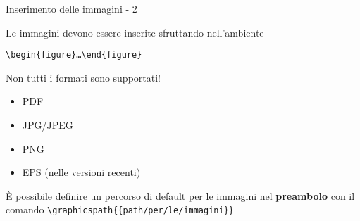 \begin{frame}{Inserimento delle immagini - 2}
	
Le immagini devono essere inserite sfruttando nell'ambiente 
\centerline{
\texttt{\textbackslash{}begin\{figure\}\dots{}\textbackslash{}end\{figure\}}
}

\vfill

Non tutti i formati sono supportati!
\begin{itemize}
	\item PDF
	\item JPG/JPEG
	\item PNG
	\item EPS (nelle versioni recenti)
\end{itemize}

\vfill

È possibile definire un percorso di default per le immagini nel 
\textbf{preambolo} con il comando 
\texttt{\textbackslash{}graphicspath\{\{path/per/le/immagini\}\}}

\end{frame}
